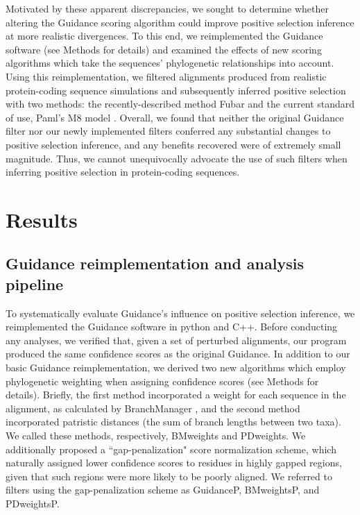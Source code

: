 \documentclass[10pt]{article}
\begin{document}
Motivated by these apparent discrepancies, we sought to determine whether altering the Guidance scoring algorithm could improve positive selection inference at more realistic divergences. To this end, we reimplemented the Guidance software (see Methods for details) and examined the effects of new scoring algorithms which take the sequences' phylogenetic relationships into account. Using this reimplementation, we filtered alignments produced from realistic protein-coding sequence simulations and subsequently inferred positive selection with two methods: the recently-described method Fubar \citep{Murrell2013} and the current standard of use, Paml's M8 model \citep{Yang2007}. Overall, we found that neither the original Guidance filter nor our newly implemented filters conferred any substantial changes to positive selection inference, and any benefits recovered were of extremely small magnitude. Thus, we cannot unequivocally advocate the use of such filters when inferring positive selection in protein-coding sequences.


\section*{Results}

\subsection*{Guidance reimplementation and analysis pipeline}
To systematically evaluate Guidance's influence on positive selection inference, we reimplemented the Guidance software in python and C++. Before conducting any analyses, we verified that, given a set of perturbed alignments, our program produced the same confidence scores as the original Guidance. In addition to our basic Guidance reimplementation, we derived two new algorithms which employ phylogenetic weighting when assigning confidence scores (see Methods for details).  Briefly, the first method incorporated a weight for each sequence in the alignment, as calculated by BranchManager \citep{Stone2007}, and the second method incorporated patristic distances (the sum of branch lengths between two taxa). We called these methods, respectively, BMweights and PDweights.  We additionally proposed a ``gap-penalization" score normalization scheme, which naturally assigned lower confidence scores to residues in highly gapped regions, given that such regions were more likely to be poorly aligned. We referred to filters using the gap-penalization scheme as GuidanceP, BMweightsP, and PDweightsP.
\end{document}
